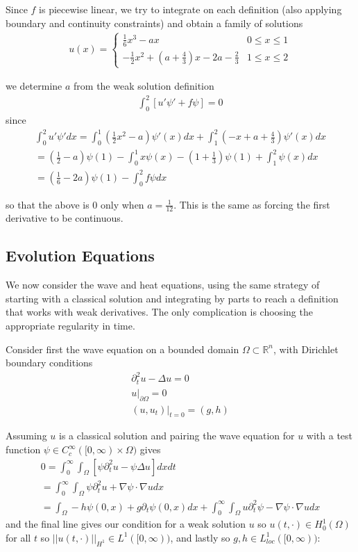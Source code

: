 \documentclass{article}
\newcommand{\R}{{\mathbb{R}}}
\newcommand{ \norm }[1]{{ || {#1}||}}
\newcommand{\pd}{\partial}
\newcommand{\CC}{C_{c}^{\infty}}
\begin{document}
	Since $f$ is piecewise linear, we try to integrate on each definition (also applying boundary and continuity constraints) and obtain a family of solutions 
	\begin{align*}
		u(x) = \begin{cases}
			\frac{1}{6} x^{3} - ax & 0 \leq x \leq 1 \\
			-\frac{1}{2}x^{2} + (a+\frac{4}{3})x-2a-\frac{2}{3} & 1 \leq x \leq 2
		\end{cases}
	\end{align*}
	
	we determine $a$ from the weak solution definition
	\begin{align*}
		\int_{0}^{2}[u'\psi' + f\psi ]=0
	\end{align*}
	since
	\begin{align*}
		\int_{0}^{2} u'\psi'dx = \int_{0}^{1} (\frac{1}{2}x^{2}-a)\psi'(x)dx + \int_{1}^{2}(-x+a+\frac{4}{3})\psi'(x)dx \\
		= (\frac{1}{2}-a)\psi(1) - \int_{0}^{1} x \psi(x) - (1+\frac{1}{3})\psi(1) + \int_{1}^{2}\psi(x)dx\\
		= (\frac{1}{6} - 2a)\psi(1) - \int_{0}^{2}f \psi dx
	\end{align*}
	
	so that the above is $0$ only when $a = \frac{1}{12}$. This is the same as forcing the first derivative to be continuous. 
	
	
	\subsection{Evolution Equations}
	
	We now consider the wave and heat equations, using the same strategy of starting with a classical solution and integrating by parts to reach a definition that works with weak derivatives. The only complication is choosing the appropriate regularity in time. 
	
	Consider first the wave equation on a bounded domain $\Omega \subset \R^{n}$, with Dirichlet boundary conditions
	\begin{align*}
		\pd_{t}^{2} u - \Delta u = 0 \\
		u|_{\pd \Omega} = 0 \\
		(u,u_{t})|_{t=0} = (g,h)
	\end{align*}
	
	Assuming $u$ is a classical solution and pairing the wave equation for $u$ with a test function $\psi \in \CC([0,\infty) \times \Omega)$ gives
	\begin{align*}
		0=\int_{0}^{\infty} \int_{\Omega} \left[\psi \pd_{t}^{2}u - \psi \Delta u \right]dxdt \\
		= \int_{0}^{\infty} \int_{\Omega} \psi \pd_{t}^2 u + \nabla \psi \cdot \nabla u dx \\
		= \int_{\Omega} -h \psi(0,x) + g \pd_{t}\psi(0,x)dx + \int_{0}^{\infty} \int_{\Omega} u \pd_{t}^{2}\psi  - \nabla \psi \cdot \nabla u dx
	\end{align*}
	and the final line gives our condition for a weak solution $u$ so $u(t,\cdot) \in H^{1}_{0}(\Omega)$ for all $t$ so $\norm{u(t,\cdot)}_{H^{1}} \in L^{1}([0,\infty))$, and lastly so $g,h \in L^{1}_{loc}([0,\infty))$:
	
\end{document}
